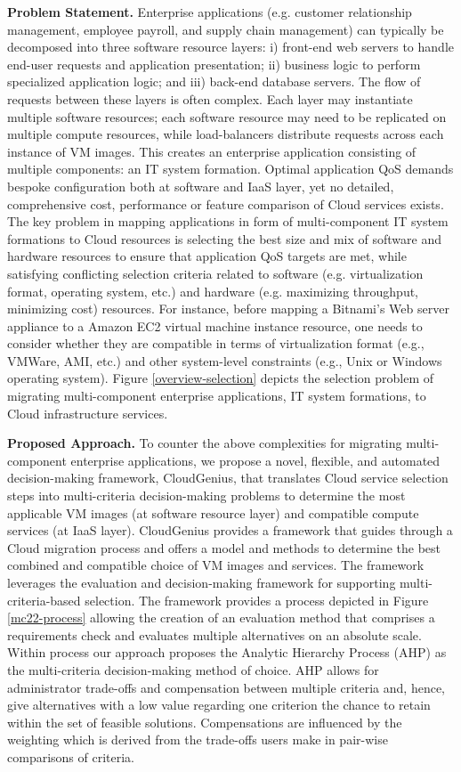 \documentclass[10pt]{article}
\begin{document}
\textbf{Problem Statement.} Enterprise applications (e.g. customer relationship management, employee payroll, and supply chain management) can typically be decomposed into three software resource layers: i) front-end web servers to handle end-user requests and application presentation; ii) business logic to perform specialized application logic; and iii) back-end database servers. The flow of requests between these layers is often complex. Each layer may instantiate multiple software resources; each software resource may need to be replicated on multiple compute resources, while load-balancers distribute requests across each instance of VM images. This creates an enterprise application consisting of multiple components: an IT system formation. Optimal application QoS demands bespoke configuration both at software and IaaS layer, yet no detailed, comprehensive cost, performance or feature comparison of Cloud services exists. The key problem in mapping applications in form of multi-component IT system formations to Cloud resources is selecting the best size and mix of software and hardware resources to ensure that application QoS targets are met, while satisfying conflicting selection criteria \cite{SPE:SPE1110} related to software (e.g. virtualization format, operating system, etc.) and hardware (e.g. maximizing throughput, minimizing cost) resources. For instance, before mapping a Bitnami's Web server appliance \cite{bitnami2011} to a Amazon EC2\cite{awsec22011} virtual machine instance resource, one needs to consider whether they are compatible in terms of virtualization format (e.g., VMWare, AMI, etc.) and other system-level constraints (e.g., Unix or Windows operating system).
Figure \ref{overview-selection} depicts the selection problem of migrating multi-component enterprise applications, IT system formations, to Cloud infrastructure services.

\textbf{Proposed Approach.} To counter the above complexities for migrating multi-component enterprise applications, we propose a novel, flexible, and automated decision-making framework, CloudGenius, that translates Cloud service selection steps into multi-criteria decision-making problems to determine the most applicable VM images (at software resource layer) and compatible compute services (at IaaS layer). CloudGenius provides a framework that guides through a Cloud migration process and offers a model and methods to determine the best combined and compatible choice of VM images and services. The framework leverages the evaluation and decision-making framework  \cite{menzel2010} for supporting  multi-criteria-based selection. The  framework provides a process depicted in Figure \ref{mc22-process} allowing the creation of an evaluation method that comprises a requirements check and evaluates multiple alternatives on an absolute  scale. Within  process our approach proposes the Analytic Hierarchy Process (AHP) as the multi-criteria decision-making method of choice. AHP allows for administrator trade-offs and compensation between multiple criteria and, hence, give alternatives with a low value regarding one criterion the chance to retain within the set of feasible solutions. Compensations are influenced by the weighting which is derived from the trade-offs users make in pair-wise comparisons of criteria. 
\end{document}
